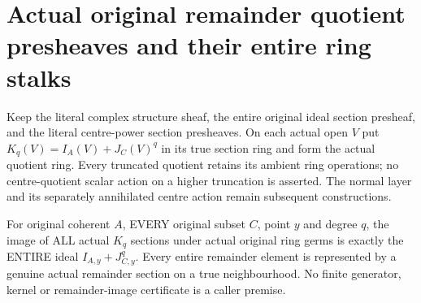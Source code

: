 \section{Actual original remainder quotient presheaves and their entire ring stalks}

Keep the literal complex structure sheaf, the entire original ideal
section presheaf, and the literal centre-power section presheaves. On each
actual open $V$ put $K_q(V)=I_A(V)+J_C(V)^q$ in its true section ring and
form the actual quotient ring. Every truncated quotient retains its
ambient ring operations; no centre-quotient scalar action on a higher
truncation is asserted. The normal layer and its separately annihilated
centre action remain subsequent constructions.

\begin{lemma}
\label{hir:real-domain-actual-remainder-section-whole-germ-image}
\leanok
For original coherent $A$, EVERY original subset $C$, point $y$ and degree
$q$, the image of ALL actual $K_q$ sections under actual original ring
germs is exactly the ENTIRE ideal $I_{A,y}+J_{C,y}^q$. Every entire
remainder element is represented by a genuine actual remainder section
on a true neighbourhood. No finite generator, kernel or remainder-image
certificate is a caller premise.
\end{lemma}
